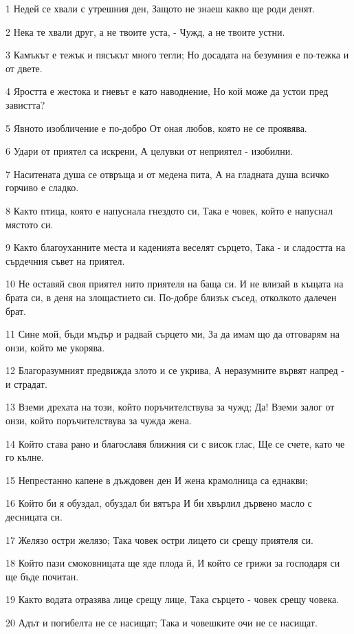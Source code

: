 \par 1 Недей се хвали с утрешния ден, Защото не знаеш какво ще роди денят.
\par 2 Нека те хвали друг, а не твоите уста, - Чужд, а не твоите устни.
\par 3 Камъкът е тежък и пясъкът много тегли; Но досадата на безумния е по-тежка и от двете.
\par 4 Яростта е жестока и гневът е като наводнение, Но кой може да устои пред завистта?
\par 5 Явното изобличение е по-добро От оная любов, която не се проявява.
\par 6 Удари от приятел са искрени, А целувки от неприятел - изобилни.
\par 7 Наситената душа се отвръща и от медена пита, А на гладната душа всичко горчиво е сладко.
\par 8 Както птица, която е напуснала гнездото си, Така е човек, който е напуснал мястото си.
\par 9 Както благоуханните места и каденията веселят сърцето, Така - и сладостта на сърдечния съвет на приятел.
\par 10 Не оставяй своя приятел нито приятеля на баща си. И не влизай в къщата на брата си, в деня на злощастието си. По-добре близък съсед, отколкото далечен брат.
\par 11 Сине мой, бъди мъдър и радвай сърцето ми, За да имам що да отговарям на онзи, който ме укорява.
\par 12 Благоразумният предвижда злото и се укрива, А неразумните вървят напред - и страдат.
\par 13 Вземи дрехата на този, който поръчителствува за чужд; Да! Вземи залог от онзи, който поръчителствува за чужда жена.
\par 14 Който става рано и благославя ближния си с висок глас, Ще се счете, като че го кълне.
\par 15 Непрестанно капене в дъждовен ден И жена крамолница са еднакви;
\par 16 Който би я обуздал, обуздал би вятъра И би хвърлил дървено масло с десницата си.
\par 17 Желязо остри желязо; Така човек остри лицето си срещу приятеля си.
\par 18 Който пази смоковницата ще яде плода й, И който се грижи за господаря си ще бъде почитан.
\par 19 Както водата отразява лице срещу лице, Така сърцето - човек срещу човека.
\par 20 Адът и погибелта не се насищат; Така и човешките очи не се насищат.
